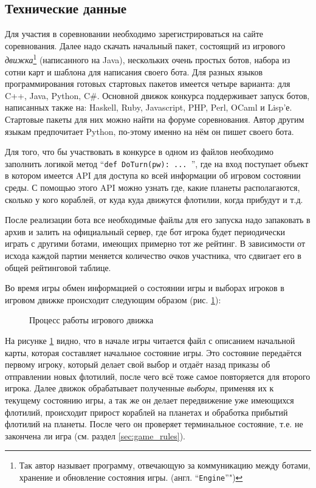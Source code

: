 \documentclass[12pt]{report}
\begin{document}
\subsection{Технические данные}
Для участия в соревновании необходимо зарегистрироваться на сайте соревнования. Далее надо скачать начальный пакет, состоящий из игрового \emph{движка}\footnote{Так автор называет программу, отвечающую за коммуникацию между ботами, хранение и обновление состояния игры. (англ. ``\texttt{Engine}''")} (написанного на Java), нескольких очень простых ботов, набора из сотни карт и шаблона для написания своего бота. Для разных языков программирования готовых стартовых пакетов имеется четыре варианта: для C++, Java, Python, C\#. Основной движок конкурса поддерживает запуск ботов, написанных также на: Haskell, Ruby, Javascript, PHP, Perl, OCaml и Lisp'е. Стартовые пакеты для них можно найти на форуме соревнования. Автор другим языкам предпочитает Python, по-этому именно на нём он пишет своего бота.

Для того, что бы участвовать в конкурсе в одном из файлов необходимо заполнить логикой метод ``\texttt{def DoTurn(pw): ... }'', где на вход поступает объект в котором имеется API для доступа ко всей информации об игровом состоянии среды. С помощью этого API можно узнать где, какие планеты располагаются, сколько у кого кораблей, от куда куда движутся флотилии, когда прибудут и т.д. 

После реализации бота все необходимые файлы для его запуска надо запаковать в архив и залить на официальный сервер, где бот игрока будет периодически играть с другими ботами, имеющих примерно тот же рейтинг. В зависимости от исхода каждой партии меняется количество очков участника, что сдвигает его в общей рейтинговой таблице.

Во время игры обмен информацией о состоянии игры и выборах игроков в игровом движке происходит следующим образом (рис. \ref{fig:pw_engine_process}):

\begin{figure}[h]
	\centering
	
	\caption{Процесс работы игрового движка}
	\label{fig:pw_engine_process}
\end{figure}
На рисунке \ref{fig:pw_engine_process} видно, что в начале игры читается файл с описанием начальной карты, которая составляет начальное состояние игры. Это состояние передаётся первому игроку, который делает свой выбор и отдаёт назад приказы об отправлении новых флотилий, после чего всё тоже самое повторяется для второго игрока. Далее движок обрабатывает полученные \emph{выборы}, применяя их к текущему состоянию игры, а так же он делает передвижение уже имеющихся флотилий, происходит прирост кораблей на планетах и обработка прибытий флотилий на планеты. После чего он проверяет терминальное состояние, т.е. не закончена ли игра (см. раздел \ref{sec:game_rules}).
\end{document}
